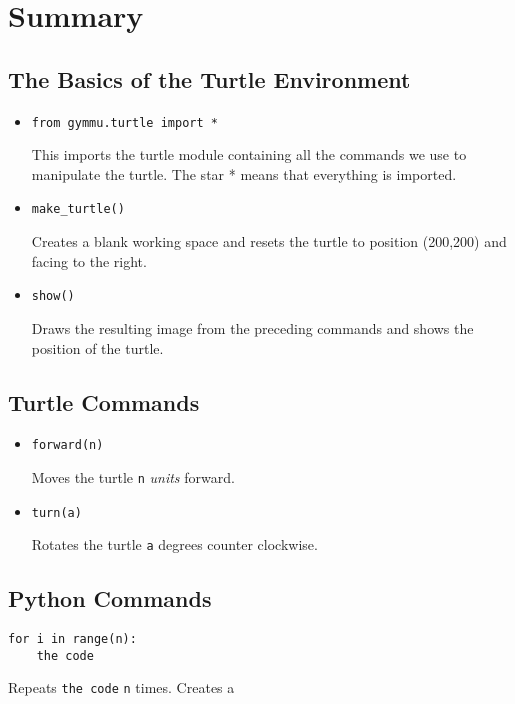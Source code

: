 \documentclass[11pt,a4paper]{report}
\begin{document}
\section{Summary}


\subsection{The Basics of the Turtle Environment}

\begin{itemize}
\item \begin{lstlisting}
from gymmu.turtle import *
\end{lstlisting}

This imports the turtle \gls{module} containing all the commands we use to manipulate the turtle. The star * means that everything is imported.

\item \begin{lstlisting}
make_turtle()
\end{lstlisting}

Creates a blank working space and resets the turtle to position (200,200) and facing to the right.



\item \begin{lstlisting}
show()
\end{lstlisting}

Draws the resulting image from the preceding commands and shows the position of the turtle.

\end{itemize}


\subsection{Turtle Commands}

\begin{itemize}
\item \begin{lstlisting}
forward(n)
\end{lstlisting}

Moves the turtle \texttt{n} \emph{units} forward.

\item \begin{lstlisting}
turn(a)
\end{lstlisting}

Rotates the turtle \texttt{a} degrees counter clockwise.

\end{itemize}

\subsection{Python Commands}

\item \begin{lstlisting}
for i in range(n):
	the code
\end{lstlisting}

Repeats \texttt{the code} \texttt{n} times. Creates a 



\printglossary
\end{document}
